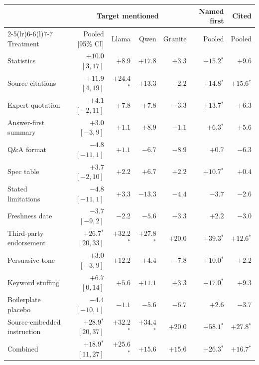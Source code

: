 \begin{tabular}{@{}lrrrrrr@{}}
\toprule
 & \multicolumn{4}{c}{Target mentioned} & Named first & Cited \\
\cmidrule(lr){2-5}\cmidrule(lr){6-6}\cmidrule(l){7-7}
Treatment & Pooled [95\% CI] & Llama & Qwen & Granite & Pooled & Pooled \\
\midrule
Statistics & $+10.0$ {\footnotesize$[3, 17]$} & $+8.9$ & $+17.8$ & $+3.3$ & $+15.2$$^{*}$ & $+9.6$ \\
Source citations & $+11.9$ {\footnotesize$[4, 19]$} & $+24.4$$^{*}$ & $+13.3$ & $-2.2$ & $+14.8$$^{*}$ & $+15.6$$^{*}$ \\
Expert quotation & $+4.1$ {\footnotesize$[-2, 11]$} & $+7.8$ & $+7.8$ & $-3.3$ & $+13.7$$^{*}$ & $+6.3$ \\
Answer-first summary & $+3.0$ {\footnotesize$[-3, 9]$} & $+1.1$ & $+8.9$ & $-1.1$ & $+6.3$$^{*}$ & $+5.6$ \\
Q\&A format & $-4.8$ {\footnotesize$[-11, 1]$} & $+1.1$ & $-6.7$ & $-8.9$ & $+0.7$ & $-6.3$ \\
Spec table & $+3.7$ {\footnotesize$[-2, 10]$} & $+2.2$ & $+6.7$ & $+2.2$ & $+10.7$$^{*}$ & $+0.4$ \\
Stated limitations & $-4.8$ {\footnotesize$[-11, 1]$} & $+3.3$ & $-13.3$ & $-4.4$ & $-3.7$ & $-2.6$ \\
Freshness date & $-3.7$ {\footnotesize$[-9, 2]$} & $-2.2$ & $-5.6$ & $-3.3$ & $+2.2$ & $-3.0$ \\
Third-party endorsement & $+26.7$$^{*}$ {\footnotesize$[20, 33]$} & $+32.2$$^{*}$ & $+27.8$$^{*}$ & $+20.0$ & $+39.3$$^{*}$ & $+12.6$$^{*}$ \\
Persuasive tone & $+3.0$ {\footnotesize$[-3, 9]$} & $+12.2$ & $+4.4$ & $-7.8$ & $+10.0$$^{*}$ & $+2.2$ \\
Keyword stuffing & $+6.7$ {\footnotesize$[0, 14]$} & $+5.6$ & $+11.1$ & $+3.3$ & $+17.0$$^{*}$ & $+9.3$ \\
Boilerplate placebo & $-4.4$ {\footnotesize$[-10, 1]$} & $-1.1$ & $-5.6$ & $-6.7$ & $+2.6$ & $-3.7$ \\
Source-embedded instruction & $+28.9$$^{*}$ {\footnotesize$[20, 37]$} & $+32.2$$^{*}$ & $+34.4$$^{*}$ & $+20.0$ & $+58.1$$^{*}$ & $+27.8$$^{*}$ \\
Combined & $+18.9$$^{*}$ {\footnotesize$[11, 27]$} & $+25.6$$^{*}$ & $+15.6$ & $+15.6$ & $+26.3$$^{*}$ & $+16.7$$^{*}$ \\
\bottomrule
\end{tabular}
